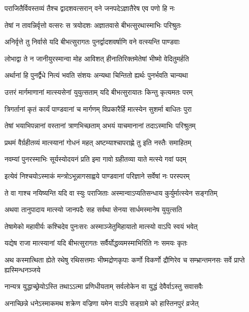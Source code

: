 \twolineshloka
{पराजितैर्विवस्तव्यं तैश्च द्वादशवत्सरान्}
{वने जनपदेऽज्ञातैरेष एव पणो हि नः}


\twolineshloka
{तेषां न तावन्निर्वृत्तो वत्सरः स त्रयोदशः}
{अज्ञातवासे बीभत्सुरथास्माभिः परिश्रुतः}


\twolineshloka
{अनिर्वृत्ते तु निर्वासे यदि बीभत्सुरागतः}
{पुनर्द्वादशवर्षाणि वने वत्स्यन्ति पाण्डवाः}


\twolineshloka
{लोभाद्वा ते न जानीयुरस्मान्वा मोह आविशत्}
{हीनातिरिक्तमेतेषां भीष्मो वेदितुमर्हति}


\twolineshloka
{अर्थानां हि पुनर्द्वैधे नित्यं भवति संशयः}
{अन्यथा चिन्तितो ह्यर्थः पुनर्भवति चान्यथा}


\twolineshloka
{उत्तरं मार्गमाणानां मात्स्यसेनां युयुत्सताम्}
{यदि बीभत्सुरायातः किन्तु कृत्यमतः परम्}


\twolineshloka
{त्रिगर्तानां कृतं कार्यं पाण्डवानां च मार्गणम्}
{विप्रकारैर्हि मात्स्येन सुशर्मा बाधितः पुरा}


\twolineshloka
{तेषां भयाभिपन्नानां वस्तानां त्राणभिच्छताम्}
{अभयं याचमानानां तदाऽस्माभिः परिश्रुतम्}


\twolineshloka
{प्रथमं वैर्ग्रहीतव्यं मात्स्यानां गोधनं महत्}
{अष्टम्याश्चापराह्णे तु इति नस्तैः समाहितम्}


\twolineshloka
{नवम्यां पुनरस्माभिः सूर्यस्योदयनं प्रति}
{इमा गावो ग्रहीतव्या याते मत्स्ये गवां पदम्}


\twolineshloka
{इत्येवं निश्चयोऽस्माकं मन्त्रोऽभून्नागसाह्वये}
{पाण्डवानां परिज्ञाने सर्वेषां नः परस्परम्}


\twolineshloka
{ते वा गाश्च नयिष्यन्ति यदि वा स्युः पराजिताः}
{अस्मान्वाऽप्यतिसन्धाय कुर्युर्मात्स्येन सङ्गतिम्}


\twolineshloka
{अथवा तानुपादाय मात्स्यो जानपदैः सह}
{सर्वथा सेनया सार्धमस्मानेष युयुत्सति}


\twolineshloka
{तेषामेको महावीर्यः कश्चिदेव पुनःसरः}
{अस्माञ्जेतुमिहायातो मात्स्यो वाऽपि स्वयं भवेत्}


\twolineshloka
{यद्येष राजा मात्स्यानां यदि बीभत्सुरागतः}
{सर्वैर्योद्धव्यमस्माभिरिति नः समयः कृतः}


\threelineshloka
{अथ कस्मात्थिता ह्येते रथेषु रथिसत्तमाः}
{भीष्मद्रोणकृपाः कर्णो विकर्णो द्रौणिरेव च}
{सम्भ्रान्तमनसः सर्वे प्राप्ते ह्यस्मिन्धनञ्जये}


\twolineshloka
{नान्यत्र युद्धाच्छ्रेयोऽस्ति तथाऽऽत्मा प्रणिधीयताम्}
{सर्वलोकेन वा युद्धं देवैर्वाऽस्तु सवासवैः}


\twolineshloka
{अनाच्छिन्ने धनेऽस्माकमथ शक्रेण वज्रिणा}
{यमेन वाऽपि सङ्ग्रामे को हास्तिनपुरं व्रजेत्}


